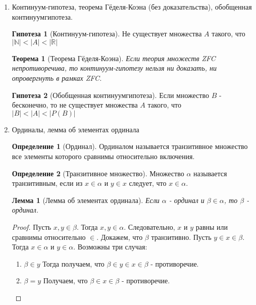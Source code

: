 \documentclass[a4paper]{article}
\newtheorem*{theorem*}{Теорема}
\newtheorem*{lemma*}{Лемма}
\theoremstyle{definition}
\newtheorem*{definition*}{Определение}
\newtheorem*{hypo}{Гипотеза}
\begin{document}
\begin{enumerate}
\begin{proof}
\begin{itemize}
        \end{itemize}
       \end{proof}
 \item Континуум-гипотеза, теорема Гёделя-Коэна (без доказательства), обобщенная континуумгипотеза.
       \begin{hypo}[Континуум-гипотеза] Не существует множества $A$ такого, что\\
        $\left | \mathbb{N} \right | < \left | A \right | < \left | \mathbb{R} \right |$
       \end{hypo}
       \begin{theorem*}[Теорема Гёделя-Коэна]
        Если теория множеств ZFC непротиворечива, то континуум-гипотезу нельзя ни доказать, ни опровергнуть в рамках ZFC.
       \end{theorem*}
       \begin{hypo}[Обобщенная континуумгипотеза]
        Если множество $B$ - бесконечно, то не существует множества $A$ такого, что\\ $\left | B \right | < \left | A \right | < \left | P(B) \right |$
       \end{hypo}
 \item Ординалы, лемма об элементах ординала
       \begin{definition*}[Ординал]
        Ординалом называется транзитивное множество все элементы которого сравнимы относительно включения.
       \end{definition*}
       \begin{definition*}[Транзитивное множество]
        Множество $\alpha$ называется транзитивным, если из $x \in \alpha $ и $y \in x $ следует, что  $x \in \alpha $.
       \end{definition*}
       \begin{lemma*}[Лемма об элементах ординала]
        Если $\alpha$ - ординал и $\beta \in \alpha$, то $\beta$ - ординал.
       \end{lemma*}
       \begin{proof}
        Пусть $x,y\in \beta$. Тогда $x,y\in \alpha$. Следовательно, $x$ и $y$ равны или сравнимы относительно $\in$. Докажем, что $\beta$ транзитивно. Пусть $y \in x \in \beta$. Тогда $x \in \alpha$ и $y \in \alpha$. Возможны три случая:
        \begin{enumerate}
         \item $\beta \in y$ Тогда получаем, что $\beta \in y \in x \in \beta$ - противоречие.
         \item $\beta = y$ Получаем, что $\beta \in x \in \beta$ - противоречие.

\end{enumerate}
\end{proof}
\end{enumerate}
\end{document}
